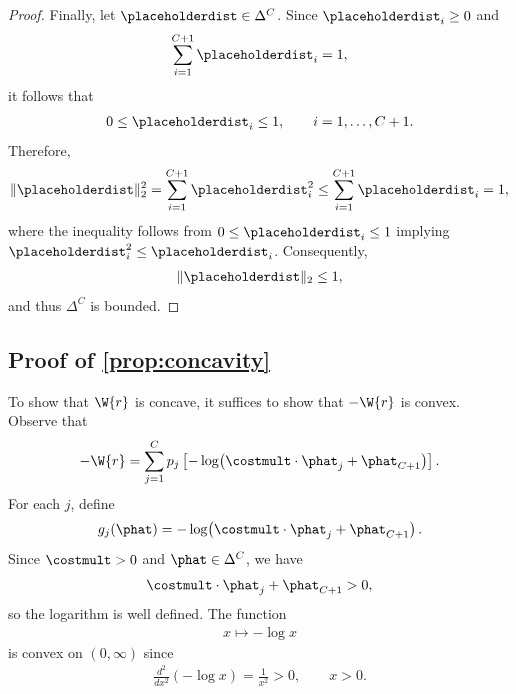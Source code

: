 \begin{proof}
    Finally, let $\placeholderdist\in\Delta^C$. Since $\placeholderdist_i\ge 0$ and
    \begin{align*}
        \sum_{i=1}^{C+1} \placeholderdist_i = 1,
    \end{align*}
    it follows that
    \begin{align*}
        0 \le \placeholderdist_i \le 1,
        \qquad i=1,\dots,C+1.
    \end{align*}
    Therefore,
    \begin{align*}
        \|\placeholderdist\|_2^2
        =
        \sum_{i=1}^{C+1} \placeholderdist_i^2
        \le
        \sum_{i=1}^{C+1} \placeholderdist_i
        =
        1,
    \end{align*}
    where the inequality follows from $0\le \placeholderdist_i\le 1$ implying
    $\placeholderdist_i^2\le \placeholderdist_i$. Consequently,
    \begin{align*}
        \|\placeholderdist\|_2 \le 1,
    \end{align*}
    and thus $\Delta^C$ is bounded.
\end{proof}

\subsection{Proof of \cref{prop:concavity}}
\label{subsec:proof_concavity}
\propConcavity*
To show that $\W{r}$ is concave, it suffices to show that $-\W{r}$ is convex. Observe that
\begin{align*}
    -\W{r}
    =
    \sum_{j=1}^{C}
    p_j
    \left[
        -\log\!\left(
        \costmult\cdot\phat_j+\phat_{C+1}
        \right)
        \right].
\end{align*}
For each $j$, define
\begin{align*}
    g_j(\phat)
    =
    -\log\!\left(
    \costmult\cdot\phat_j+\phat_{C+1}
    \right).
\end{align*}
Since $\costmult>0$ and $\phat\in\Delta^C$, we have
\begin{align*}
    \costmult\cdot\phat_j+\phat_{C+1}>0,
\end{align*}
so the logarithm is well defined. The function
\begin{align*}
    x\mapsto-\log x
\end{align*}
is convex on $(0,\infty)$ since
\begin{align*}
    \frac{d^2}{dx^2}(-\log x)
    =
    \frac{1}{x^2}
    >
    0,
    \qquad x>0.
\end{align*}

